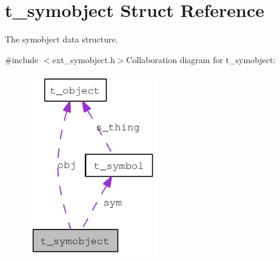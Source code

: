 \hypertarget{structt__symobject}{
\section{t\_\-symobject Struct Reference}
\label{structt__symobject}
}


The symobject data structure.  


{\ttfamily \#include $<$ext\_\-symobject.h$>$}Collaboration diagram for t\_\-symobject:\nopagebreak
\begin{figure}[H]
\begin{center}
\leavevmode
\includegraphics[width=158pt]{structt__symobject__coll__graph}
\end{center}
\end{figure}
